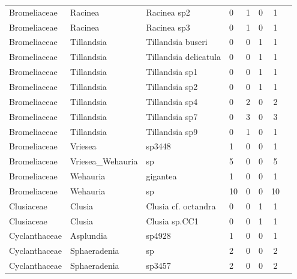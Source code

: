 \documentclass[a4paper,12pt]{article}
\begin{document}
\begin{table}[H]
\begin{tabular}{llllcccc}
        Bromeliaceae & Racinea & Racinea sp2 & 0 & 1 & 0 & 1 \\
        Bromeliaceae & Racinea & Racinea sp3 & 0 & 1 & 0 & 1 \\
        Bromeliaceae & Tillandsia & Tillandsia buseri & 0 & 0 & 1 & 1 \\
        Bromeliaceae & Tillandsia & Tillandsia delicatula & 0 & 0 & 1 & 1 \\
        Bromeliaceae & Tillandsia & Tillandsia sp1 & 0 & 0 & 1 & 1 \\
        Bromeliaceae & Tillandsia & Tillandsia sp2 & 0 & 0 & 1 & 1 \\
        Bromeliaceae & Tillandsia & Tillandsia sp4 & 0 & 2 & 0 & 2 \\
        Bromeliaceae & Tillandsia & Tillandsia sp7 & 0 & 3 & 0 & 3 \\
        Bromeliaceae & Tillandsia & Tillandsia sp9 & 0 & 1 & 0 & 1 \\
        Bromeliaceae & Vriesea & sp3448 & 1 & 0 & 0 & 1 \\
        Bromeliaceae & Vriesea\_Wehauria & sp & 5 & 0 & 0 & 5 \\
        Bromeliaceae & Wehauria & gigantea & 1 & 0 & 0 & 1 \\
        Bromeliaceae & Wehauria & sp & 10 & 0 & 0 & 10 \\
        Clusiaceae & Clusia & Clusia cf. octandra & 0 & 0 & 1 & 1 \\
        Clusiaceae & Clusia & Clusia sp.CC1 & 0 & 0 & 1 & 1 \\
        Cyclanthaceae & Asplundia & sp4928 & 1 & 0 & 0 & 1 \\
        Cyclanthaceae & Sphaeradenia & sp & 2 & 0 & 0 & 2 \\
        Cyclanthaceae & Sphaeradenia & sp3457 & 2 & 0 & 0 & 2 \\

        \hline
    \end{tabular}%

    \end{table}
\end{document}
